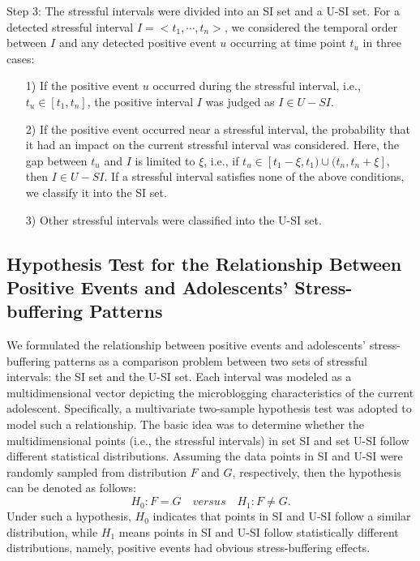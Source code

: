 \documentclass[5p,times,numbers,authoryear]{elsarticle}
\begin{document}
Step 3: The stressful intervals were divided into an SI set and a U-SI set.
For a detected stressful interval $I = <t_1,\cdots,t_n>$, we considered the temporal order between $I$ and any detected positive event $u$ occurring at time point $t_u$ in three cases:
\begin{itemize}
\item[1)] If the positive event $u$ occurred during the stressful interval, i.e., $t_u \in [t_1,t_n]$, the positive interval $I$ was judged as $I \in U-SI$.
\vspace{-0.3cm}
\item[2)] If the positive event occurred near a stressful interval, the probability that it had an impact on the current stressful interval was considered.
Here, the gap between $t_u$ and $I$ is limited to $\xi$, i.e.,
if $t_u \in [t_{1}-\xi, t_1)\cup(t_{n},t_{n}+\xi]$, then $I \in U-SI$.
If a stressful interval satisfies none of the above conditions, we classify it into the SI set.
\vspace{-0.3cm}
\item[3)] Other stressful intervals were classified into the U-SI set.
\end{itemize}

\subsection{Hypothesis Test for the Relationship Between Positive Events and Adolescents' Stress-buffering Patterns}
\label{sec:frame2}
We formulated the relationship between positive events and adolescents' stress-buffering patterns as a comparison problem between two sets of stressful intervals: the SI set and the U-SI set.
Each interval was modeled as a multidimensional vector depicting the microblogging characteristics of the current adolescent.
Specifically, a multivariate two-sample hypothesis test 
\cite{Li2017Correlating,Johnson2012Applied} was adopted to model such a relationship.
The basic idea was to determine whether the multidimensional points (i.e., the stressful intervals)
in set SI and set U-SI follow different statistical distributions.
Assuming the data points in SI and U-SI were randomly sampled from distribution $F$ and $G$, respectively, then the hypothesis can be denoted as follows:
\begin{equation}
H_0: F = G \quad versus \quad H_1: F \neq G.
\end{equation}
Under such a hypothesis,
$H_0$ indicates that points in SI and U-SI follow a similar distribution,
while $H_1$ means points in SI and U-SI follow statistically different distributions,
namely, positive events had obvious stress-buffering effects.
\end{document}
